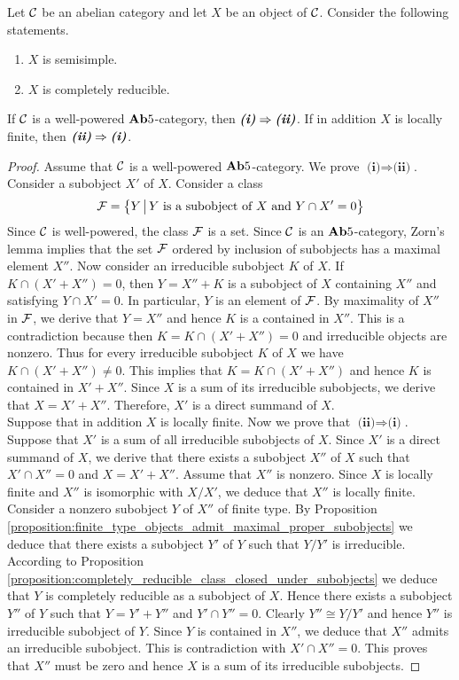 \begin{theorem}
Let ${\mathcal C}$ be an abelian category and let $X$ be an object of ${\mathcal C}$. Consider the following statements.
\begin{enumerate}[label=\emph{\textbf{(\roman*)}}, leftmargin=3.0em]
\item $X$ is semisimple.
\item $X$ is completely reducible.
\end{enumerate}
If ${\mathcal C}$ is a well-powered $\mathbf{Ab}5$-category, then $\emph{\textbf{(i)}}\Rightarrow \emph{\textbf{(ii)}}$. If in addition $X$ is locally finite, then $\emph{\textbf{(ii)}} \Rightarrow \emph{\textbf{(i)}}$.
\end{theorem}
\begin{proof}
Assume that ${\mathcal C}$ is a well-powered $\mathbf{Ab}5$-category. We prove $\textbf{(i)}\Rightarrow \textbf{(ii)}$. Consider a subobject $X'$ of $X$. Consider a class
$${\mathcal F}=\big\{Y\,\big|\,Y\mbox{ is a subobject of }X\mbox{ and }Y\cap X' =0\big\}$$
Since ${\mathcal C}$ is well-powered, the class ${\mathcal F}$ is a set. Since ${\mathcal C}$ is an $\mathbf{Ab}5$-category, Zorn's lemma implies that the set ${\mathcal F}$ ordered by inclusion of subobjects has a maximal element $X''$. Now consider an irreducible subobject $K$ of $X$. If $K\cap (X'+X'')= 0$, then $Y = X'' + K$ is a subobject of $X$ containing $X''$ and satisfying $Y\cap X' = 0$. In particular, $Y$ is an element of ${\mathcal F}$. By maximality of $X''$ in ${\mathcal F}$, we derive that $Y = X''$ and hence $K$ is a contained in $X''$. This is a contradiction because then $K= K \cap (X' + X'') = 0$ and irreducible objects are nonzero. Thus for every irreducible subobject $K$ of $X$ we have $K\cap (X'+X'')\neq 0$. This implies that $K = K\cap (X'+X'')$ and hence $K$ is contained in $X'+X''$. Since $X$ is a sum of its irreducible subobjects, we derive that $X = X' + X''$. Therefore, $X'$ is a direct summand of $X$.\\
Suppose that in addition $X$ is locally finite. Now we prove that $\textbf{(ii)}\Rightarrow \textbf{(i)}$. Suppose that $X'$ is a sum of all irreducible subobjects of $X$. Since $X'$ is a direct summand of $X$, we derive that there exists a subobject $X''$ of $X$ such that $X'\cap X''=0$ and $X = X'+X''$. Assume that $X''$ is nonzero. Since $X$ is locally finite and $X''$ is isomorphic with $X/X'$, we deduce that $X''$ is locally finite. Consider a nonzero subobject $Y$ of $X''$ of finite type. By Proposition \ref{proposition:finite_type_objects_admit_maximal_proper_subobjects} we deduce that there exists a subobject $Y'$ of $Y$ such that $Y/Y'$ is irreducible. According to Proposition \ref{proposition:completely_reducible_class_closed_under_subobjects} we deduce that $Y$ is completely reducible as a subobject of $X$. Hence there exists a subobject $Y''$ of $Y$ such that $Y = Y' + Y''$ and $Y'\cap Y''=0$. Clearly $Y''\cong Y/Y'$ and hence $Y''$ is irreducible subobject of $Y$. Since $Y$ is contained in $X''$, we deduce that $X''$ admits an irreducible subobject. This is contradiction with $X'\cap X'' = 0$. This proves that $X''$ must be zero and hence $X$ is a sum of its irreducible subobjects.
\end{proof}


















\small



